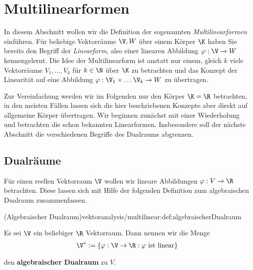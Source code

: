 \documentclass[letterpaper,10pt,german]{jupyterBook}
\begin{document}
\section{Multilinearformen}
\label{\detokenize{vektoranalysis/multilinear:multilinearformen}}\label{\detokenize{vektoranalysis/multilinear:s-multilinearformen}}\label{\detokenize{vektoranalysis/multilinear::doc}}
\par
In diesem Abschnitt wollen wir die Definition der sogenannten \emph{Multilinearformen} einführen.
Für beliebige Vektorräume \(\V, W\) über einem Körper \(\K\) haben Sie bereits den Begriff der \emph{Linearform}, also einer linearen Abbildung \(\varphi:\V\rightarrow W\) kennengelernt.
Die Idee der Multilinearform ist anstatt nur einem, gleich \(k\) viele Vektorräume \(V_1,\ldots,V_k\) für \(k \in \N\) über \(\K\) zu betrachten und das Konzept der Linearität auf eine Abbildung \(\varphi:\V_1\times\ldots\V_k\rightarrow W\) zu übertragen.

\par
Zur Vereinfachung werden wir im Folgenden nur den Körper \(\K=\R\) betrachten, in den meisten Fällen lassen sich die hier beschriebenen Konzepte aber direkt auf allgemeine Körper übertragen.
Wir beginnen zunächst mit einer Wiederholung und betrachten die schon bekannten Linearformen.
Insbesondere soll der nächste Abschnitt die verschiedenen Begriffe des Dualraums abgrenzen.


\subsection{Dualräume}
\label{\detokenize{vektoranalysis/multilinear:dualraume}}
\par
Für einen reellen Vektorraum \(\V\) wollen wir lineare Abbildungen \(\varphi:V\to\R\) betrachten.
Diese lassen sich mit Hilfe der folgenden Definition zum algebraischen Dualraum zusammenfassen.
\begin{definition}{(Algebraischer Dualraum)}{vektoranalysis/multilinear:def:algebraischerDualraum}



\par
Es sei \(\V\) ein beliebiger \(\R\) Vektorraum.
Dann nennen wir die Menge
\begin{align*}
\V^\ast := \{\varphi:\V\rightarrow\R: \varphi\text{ ist linear}\}
\end{align*}
\par
den \textbf{algebraischer Dualraum} zu \(V\).
\end{definition}
\end{document}

